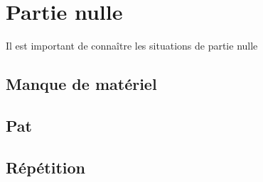 
\section{Partie nulle}

Il est important de connaître les situations de partie nulle

\subsection{Manque de matériel}
\subsection{Pat}
\subsection{Répétition}

